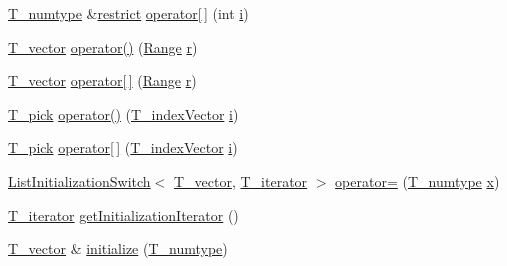 \begin{DoxyCompactItemize}
\item 
\hyperlink{classVector_a63dfe9fb06d8b4595b9e8fb10fc0755e}{T\+\_\+numtype} \&\hyperlink{compiler_8h_a080abdcb9c02438f1cd2bb707af25af8}{restrict} \hyperlink{classVector_abdc2fcc26323ccba699ca8f1a6102b74}{operator\mbox{[}$\,$\mbox{]}} (int \hyperlink{indexexpr_8h_aabd77643995707c185e95c8cb2782c81}{i})
\item 
\hyperlink{classVector_a29e279edfeac4d65aad0d814c05cfaf0}{T\+\_\+vector} \hyperlink{classVector_aa4e9255348248f40e454f3e6639fd3b7}{operator()} (\hyperlink{classRange}{Range} \hyperlink{indexexpr_8h_ac434fd11cc2493608d8d91424d60c17e}{r})
\item 
\hyperlink{classVector_a29e279edfeac4d65aad0d814c05cfaf0}{T\+\_\+vector} \hyperlink{classVector_a12f5164b480eef511e3e192b976efce5}{operator\mbox{[}$\,$\mbox{]}} (\hyperlink{classRange}{Range} \hyperlink{indexexpr_8h_ac434fd11cc2493608d8d91424d60c17e}{r})
\item 
\hyperlink{classVector_a5fbb048b36ae3897d8b0c6d993b33a9d}{T\+\_\+pick} \hyperlink{classVector_ad6829a2327882fe77c8ba5ba523add7a}{operator()} (\hyperlink{classVector_aa02a1323b0f3ca8c6cc82732fad69768}{T\+\_\+index\+Vector} \hyperlink{indexexpr_8h_aabd77643995707c185e95c8cb2782c81}{i})
\item 
\hyperlink{classVector_a5fbb048b36ae3897d8b0c6d993b33a9d}{T\+\_\+pick} \hyperlink{classVector_a81cc4fba69333b0932f6460a9c0021a5}{operator\mbox{[}$\,$\mbox{]}} (\hyperlink{classVector_aa02a1323b0f3ca8c6cc82732fad69768}{T\+\_\+index\+Vector} \hyperlink{indexexpr_8h_aabd77643995707c185e95c8cb2782c81}{i})
\item 
\hyperlink{classListInitializationSwitch}{List\+Initialization\+Switch}$<$ \hyperlink{classVector_a29e279edfeac4d65aad0d814c05cfaf0}{T\+\_\+vector}, \hyperlink{classVector_a3595565cd5a82f30d054fe37d0aaa802}{T\+\_\+iterator} $>$ \hyperlink{classVector_ae91d623820c477af80690f777ebca547}{operator=} (\hyperlink{classVector_a63dfe9fb06d8b4595b9e8fb10fc0755e}{T\+\_\+numtype} \hyperlink{vecnorm1_8cc_ac73eed9e41ec09d58f112f06c2d6cb63}{x})
\item 
\hyperlink{classVector_a3595565cd5a82f30d054fe37d0aaa802}{T\+\_\+iterator} \hyperlink{classVector_a4a59fc0b4ccc854f6991701b3dd47603}{get\+Initialization\+Iterator} ()
\item 
\hyperlink{classVector_a29e279edfeac4d65aad0d814c05cfaf0}{T\+\_\+vector} \& \hyperlink{classVector_ad61d3086a8599625c7c15dfc96ab7f73}{initialize} (\hyperlink{classVector_a63dfe9fb06d8b4595b9e8fb10fc0755e}{T\+\_\+numtype})
\item 

\end{DoxyCompactItemize}
